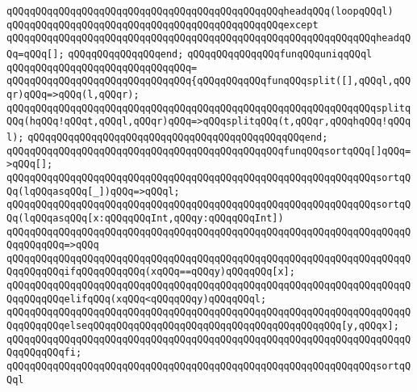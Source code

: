 \verb|qQQqqQQqqQQqqQQqqQQqqQQqqQQqqQQqqQQqqQQqqQQqqQQqheadqQQq(loopqQQql)|\newline
\verb|qQQqqQQqqQQqqQQqqQQqqQQqqQQqqQQqqQQqqQQqqQQqqQQqexcept|\newline
\verb|qQQqqQQqqQQqqQQqqQQqqQQqqQQqqQQqqQQqqQQqqQQqqQQqqQQqqQQqqQQqqQQqheadqQQq=qQQq[];|\newline
\verb|qQQqqQQqqQQqqQQqend;|\newline
\newline
\verb|qQQqqQQqqQQqqQQqfunqQQquniqqQQql|\newline
\verb|qQQqqQQqqQQqqQQqqQQqqQQqqQQqqQQq=|\newline
\verb|qQQqqQQqqQQqqQQqqQQqqQQqqQQqqQQq{qQQqqQQqqQQqfunqQQqsplit([],qQQql,qQQqr)qQQq=>qQQq(l,qQQqr);|\newline
\verb|qQQqqQQqqQQqqQQqqQQqqQQqqQQqqQQqqQQqqQQqqQQqqQQqqQQqqQQqqQQqqQQqsplitqQQq(hqQQq!qQQqt,qQQql,qQQqr)qQQq=>qQQqsplitqQQq(t,qQQqr,qQQqhqQQq!qQQql);|\newline
\verb|qQQqqQQqqQQqqQQqqQQqqQQqqQQqqQQqqQQqqQQqqQQqqQQqend;|\newline
\newline
\verb|qQQqqQQqqQQqqQQqqQQqqQQqqQQqqQQqqQQqqQQqqQQqqQQqfunqQQqsortqQQq[]qQQq=>qQQq[];|\newline
\verb|qQQqqQQqqQQqqQQqqQQqqQQqqQQqqQQqqQQqqQQqqQQqqQQqqQQqqQQqqQQqqQQqsortqQQq(lqQQqasqQQq[_])qQQq=>qQQql;|\newline
\newline
\verb|qQQqqQQqqQQqqQQqqQQqqQQqqQQqqQQqqQQqqQQqqQQqqQQqqQQqqQQqqQQqqQQqsortqQQq(lqQQqasqQQq[x:qQQqqQQqInt,qQQqy:qQQqqQQqInt])|\newline
\verb|qQQqqQQqqQQqqQQqqQQqqQQqqQQqqQQqqQQqqQQqqQQqqQQqqQQqqQQqqQQqqQQqqQQqqQQqqQQqqQQq=>qQQq|\newline
\verb|qQQqqQQqqQQqqQQqqQQqqQQqqQQqqQQqqQQqqQQqqQQqqQQqqQQqqQQqqQQqqQQqqQQqqQQqqQQqqQQqifqQQqqQQqqQQq(xqQQq==qQQqy)qQQqqQQq[x];|\newline
\verb|qQQqqQQqqQQqqQQqqQQqqQQqqQQqqQQqqQQqqQQqqQQqqQQqqQQqqQQqqQQqqQQqqQQqqQQqqQQqqQQqelifqQQq(xqQQq<qQQqqQQqy)qQQqqQQql;|\newline
\verb|qQQqqQQqqQQqqQQqqQQqqQQqqQQqqQQqqQQqqQQqqQQqqQQqqQQqqQQqqQQqqQQqqQQqqQQqqQQqqQQqelseqQQqqQQqqQQqqQQqqQQqqQQqqQQqqQQqqQQqqQQqqQQq[y,qQQqx];|\newline
\verb|qQQqqQQqqQQqqQQqqQQqqQQqqQQqqQQqqQQqqQQqqQQqqQQqqQQqqQQqqQQqqQQqqQQqqQQqqQQqqQQqfi;|\newline
\newline
\verb|qQQqqQQqqQQqqQQqqQQqqQQqqQQqqQQqqQQqqQQqqQQqqQQqqQQqqQQqqQQqqQQqsortqQQql|\newline
